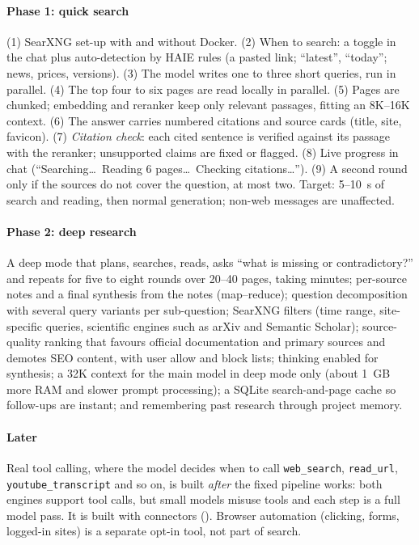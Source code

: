 \paragraph{Phase 1: quick search} (1) SearXNG set-up with and without Docker. (2) When to search: a toggle in the chat plus auto-detection by HAIE rules (a pasted link; ``latest'', ``today''; news, prices, versions). (3) The model writes one to three short queries, run in parallel. (4) The top four to six pages are read locally in parallel. (5) Pages are chunked; embedding and reranker keep only relevant passages, fitting an 8K--16K context. (6) The answer carries numbered citations and source cards (title, site, favicon). (7) \emph{Citation check}: each cited sentence is verified against its passage with the reranker; unsupported claims are fixed or flagged. (8) Live progress in chat (``Searching\dots\ Reading 6 pages\dots\ Checking citations\dots''). (9) A second round only if the sources do not cover the question, at most two. Target: 5--10~s of search and reading, then normal generation; non-web messages are unaffected.

\paragraph{Phase 2: deep research} A deep mode that plans, searches, reads, asks ``what is missing or contradictory?'' and repeats for five to eight rounds over 20--40 pages, taking minutes; per-source notes and a final synthesis from the notes (map--reduce); question decomposition with several query variants per sub-question; SearXNG filters (time range, site-specific queries, scientific engines such as arXiv and Semantic Scholar); source-quality ranking that favours official documentation and primary sources and demotes SEO content, with user allow and block lists; thinking enabled for synthesis; a 32K context for the main model in deep mode only (about 1~GB more RAM and slower prompt processing); a SQLite search-and-page cache so follow-ups are instant; and remembering past research through project memory.

\paragraph{Later} Real tool calling, where the model decides when to call \texttt{web\_search}, \texttt{read\_url}, \texttt{youtube\_transcript} and so on, is built \emph{after} the fixed pipeline works: both engines support tool calls, but small models misuse tools and each step is a full model pass. It is built with connectors (). Browser automation (clicking, forms, logged-in sites) is a separate opt-in tool, not part of search.


